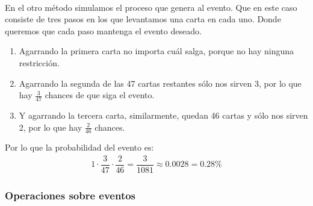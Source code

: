\documentclass[../main.tex]{subfiles}
\begin{document}
\paragraph{} En el otro método simulamos el proceso que genera al evento. Que en este caso consiste de tres pasos en los que levantamos una carta en cada uno. Donde queremos que cada paso mantenga el evento deseado.
\begin{enumerate}
  \item Agarrando la primera carta no importa cuál salga, porque no hay ninguna restricción.
  \item Agarrando la segunda de las 47 cartas restantes sólo nos sirven 3, por lo que hay \(\frac{3}{47}\) chances de que siga el evento.
  \item Y agarrando la tercera carta, similarmente, quedan 46 cartas y sólo nos sirven 2, por lo que hay \(\frac{2}{46}\) chances.
\end{enumerate}
Por lo que la probabilidad del evento es:
\begin{gather*}
  1 \cdot \dfrac{3}{47} \cdot \dfrac{2}{46} = \dfrac{3}{1081} \approx 0.0028 = 0.28\%
\end{gather*}

\subsubsection{Operaciones sobre eventos}
\end{document}
